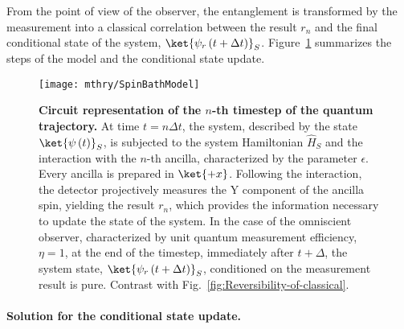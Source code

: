 From the point of view of the observer, the entanglement is transformed
by the measurement into a classical correlation between the result
$r_{n}$ and the final conditional state of the system, $\ket{\psi_{r}\left(t+\Delta t\right)}_{S}$.
Figure~\ref{fig:Ch2:SpinBath} summarizes the steps of the model
and the conditional state update.

\begin{figure}
\begin{centering}
\texttt{[image: mthry/SpinBathModel]}
\par\end{centering}
\caption[Circuit representation of the $n$-th timestep of the quantum trajectory]{\textbf{\label{fig:Ch2:SpinBath}Circuit representation of the $n$-th
timestep of the quantum trajectory. }At time $t=n\Delta t$, the system,
described by the state $\ket{\psi\left(t\right)}_{S}$, is subjected
to the system Hamiltonian $\hat{H}_{S}$ and the interaction with
the $n$-th ancilla, characterized by the parameter $\epsilon$. Every
ancilla is prepared in $\ket{+x}$. Following the interaction, the
detector projectively measures the Y component of the ancilla spin,
yielding the result $r_{n}$, which provides the information necessary
to update the state of the system. In the case of the omniscient observer,
characterized by unit quantum measurement efficiency, $\eta=1$, at
the end of the timestep, immediately after $t+\Delta$, the system
state, $\ket{\psi_{r}\left(t+\Delta t\right)}_{S}$, conditioned on
the measurement result is pure. Contrast with Fig.~\ref{fig:Reversibility-of-classical}. }
\end{figure}


\paragraph{Solution for the conditional state update. }

